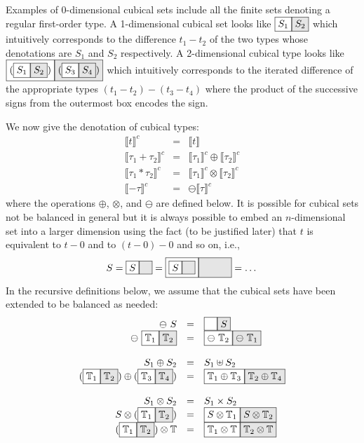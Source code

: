 \documentclass[authoryear,preprint]{sigplanconf}
\newcommand{\cubt}{\mathbb{T}}
\newcommand{\den}[1]{\llbracket #1 \rrbracket}
\newcommand{\denc}[1]{\llbracket #1 \rrbracket^c}
\newcommand{\nodet}[2]{\fcolorbox{black}{white}{$#1$}\fcolorbox{black}{gray!20}{$#2$}}
\begin{document}
Examples of 0-dimensional cubical sets include all the finite sets denoting a
regular first-order type. A 1-dimensional cubical set looks like
$\nodet{S_1}{S_2}$ which intuitively corresponds to the difference $t_1 -
t_2$ of the two types whose denotations are $S_1$ and $S_2$ respectively. A
2-dimensional cubical type looks like
$\nodet{(\nodet{S_1}{S_2})}{(\nodet{S_3}{S_4})}$ which intuitively
corresponds to the iterated difference of the appropriate types
$(t_1-t_2)-(t_3-t_4)$ where the product of the successive signs from the
outermost box encodes the sign.

We now give the denotation of cubical types:
\[\begin{array}{rcl}
\denc{t} &=& \den{t} \\
\denc{\tau_1 + \tau_2} &=& \denc{\tau_1} \oplus \denc{\tau_2} \\
\denc{\tau_1 * \tau_2} &=& \denc{\tau_1} \otimes \denc{\tau_2} \\
\denc{- \tau} &=& \ominus \denc{\tau}
\end{array}\]
where the operations $\oplus$, $\otimes$, and $\ominus$ are defined below.
It is possible for cubical sets not be balanced in general but it is always
possible to embed an $n$-dimensional set into a larger dimension using the
fact (to be justified later) that $t$ is equivalent to $t-0$ and to $(t-0)-0$
and so on, i.e.,
\[
S = \nodet{S}{\phantom{S}} = 
  \nodet{\nodet{S}{\phantom{S}}}
        {\phantom{{\nodet{S}{\phantom{S}}}}} = \ldots \\
\]
In the recursive definitions below, we assume that the cubical sets have been
extended to be balanced as needed:
\[\begin{array}{rcl}
\ominus~S &=& \nodet{\phantom{S}}{S} \\
\ominus~\nodet{\cubt_1}{\cubt_2} &=& \nodet{\ominus~\cubt_2}{\ominus~\cubt_1} \\
\\
S_1 \oplus S_2 &=& S_1 \uplus S_2 \\
(\nodet{\cubt_1}{\cubt_2}) \oplus (\nodet{\cubt_3}{\cubt_4}) &=& 
  \nodet{\cubt_1 \oplus \cubt_3}{\cubt_2 \oplus \cubt_4} \\
\\
S_1 \otimes S_2 &=& S_1 \times S_2 \\
S \otimes (\nodet{\cubt_1}{\cubt_2}) &=& 
  \nodet{S \otimes \cubt_1}{S \otimes \cubt_2} \\
(\nodet{\cubt_1}{\cubt_2}) \otimes \cubt &=& 
  \nodet{\cubt_1 \otimes \cubt}{\cubt_2 \otimes \cubt}
\end{array}\]
\end{document}

